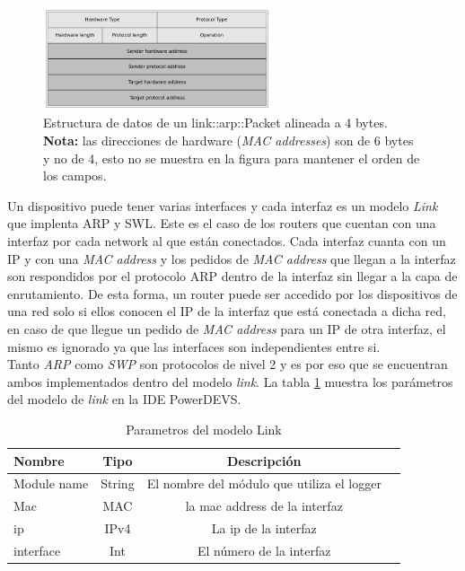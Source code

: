 \documentclass[10pt,a4paper]{article}
\begin{document}
\begin{figure}[!htb]
    \centering
    \includegraphics[width = 0.6\textwidth]{img/png/arp-packet.png}
    \caption{Estructura de datos de un link::arp::Packet alineada a 4 bytes. \textbf{Nota:} las direcciones de hardware (\textit{MAC addresses}) son de 6 bytes y no de 4, esto no se muestra en la figura para mantener el orden de los campos.}
    \label{figure: arp packet}
\end{figure}


Un dispositivo puede tener varias interfaces y cada interfaz es un modelo \textit{Link} que implenta ARP y SWL. Este es el caso de los routers que cuentan con una interfaz por cada network al que están conectados. Cada interfaz cuanta con un IP y con una \textit{MAC address} y los pedidos de \textit{MAC address} que llegan a la interfaz son respondidos por el protocolo ARP dentro de la interfaz sin llegar a la capa de enrutamiento. De esta forma, un router puede ser accedido por los dispositivos de una red solo si ellos conocen el IP de la interfaz que está conectada a dicha red, en caso de que llegue un pedido de \textit{MAC address} para un IP de otra interfaz, el mismo es ignorado ya que las interfaces son independientes entre si. \\

Tanto \textit{ARP} como \textit{SWP} son protocolos de nivel 2 y es por eso que se encuentran ambos implementados dentro del modelo \textit{link}. La tabla \ref{table: parameters link} muestra los parámetros del modelo de \textit{link} en la IDE PowerDEVS.

\begin{table}[h]
\begin{tabular}{|l|c|c|c|}
  \hline
  \textbf{Nombre} & \textbf{Tipo} & \textbf{Descripción} \\
  \hline
  Module name & String & El nombre del módulo que utiliza el logger \\
  \hline
  Mac & MAC & la mac address de la interfaz \\
  \hline
  ip & IPv4 & La ip de la interfaz \\
  \hline
  interface & Int & El número de la interfaz \\
  \hline
\end{tabular}
\caption{Parametros del modelo Link}
\label{table: parameters link}
\end{table}
\end{document}
